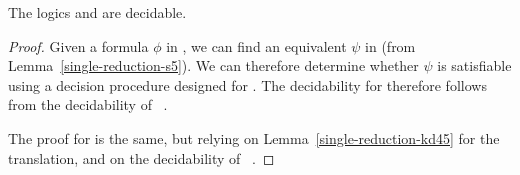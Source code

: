 
\begin{theorem}\label{single-decidable}
The logics \logicSiF{} and \logicKDiF{} are decidable.
\end{theorem}

\begin{proof}
Given a formula $\phi$ in \logicSiF{}, we can find an equivalent $\psi$ in
\logicSi{} (from Lemma~\ref{single-reduction-s5}). We can therefore determine whether
$\psi$ is satisfiable using a decision procedure designed for \logicSi{}. The
decidability for \logicSiF{} therefore follows from the decidability of
\logicSi{}~\cite{blackburn2002modal}.

The proof for \logicKDiF{} is the same, but relying on
Lemma~\ref{single-reduction-kd45} for the translation, and on the decidability of
\logicKDi{}~\cite{blackburn2002modal}.
\end{proof}

